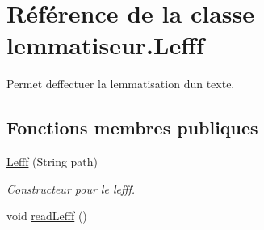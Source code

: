 \hypertarget{classlemmatiseur_1_1_lefff}{}\section{Référence de la classe lemmatiseur.\+Lefff}
\label{classlemmatiseur_1_1_lefff}


Permet d\textquotesingle{}effectuer la lemmatisation d\textquotesingle{}un texte.  


\subsection*{Fonctions membres publiques}
\begin{DoxyCompactItemize}
\item 
\hyperlink{classlemmatiseur_1_1_lefff_a52a0d72ac29d959c1f44152a6a748bcf}{Lefff} (String path)
\begin{DoxyCompactList}\small\item\em Constructeur pour le lefff. \end{DoxyCompactList}\item 
void \hyperlink{classlemmatiseur_1_1_lefff_a75daf1c87611021a0cbeba0904658455}{read\+Lefff} ()\hypertarget{classlemmatiseur_1_1_lefff_a75daf1c87611021a0cbeba0904658455}{}\label{classlemmatiseur_1_1_lefff_a75daf1c87611021a0cbeba0904658455}


\end{DoxyCompactItemize}
